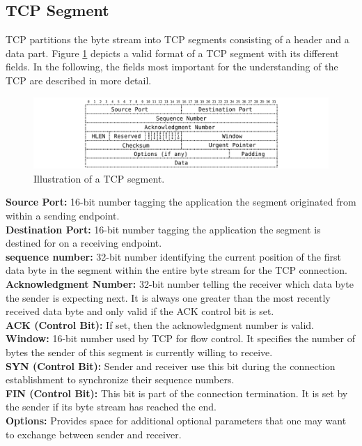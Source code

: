 \subsection*{TCP Segment}

TCP partitions the byte stream into TCP segments consisting of a header and a data part. Figure \ref{fig:TCPSegment} depicts a valid format of a TCP segment with its different fields. In the following, the fields most important for the understanding of the TCP are described in more detail. 

\begin{figure} [H]
	\begin{center}
		\def\svgwidth{1\textwidth}
		\includegraphics[scale=0.2]{../illustrations/importantConcepts/TCPSegment.pdf}  
		\caption[Caption for the list of figures.]{Illustration of a TCP segment.}
		\label{fig:TCPSegment}
	\end{center}
\end{figure}

{\small \textbf{Source Port:} 16-bit number tagging the application the segment originated from within a sending endpoint. \smallskip\\
\textbf{Destination Port:} 16-bit number tagging the application the segment is destined for on a receiving endpoint. \smallskip\\
\textbf{sequence number:} 32-bit number identifying the current position of the first data byte in the segment within the entire byte stream for the TCP connection. \smallskip\\
\textbf{Acknowledgment Number:} 32-bit number telling the receiver which data byte the sender is expecting next. It is always one greater than the most recently received data byte and only valid if the ACK control bit is set. \smallskip\\
\textbf{ACK (Control Bit):} If set, then the acknowledgment number is valid. \smallskip\\
\textbf{Window:} 16-bit number used by TCP for flow control. It specifies the number of bytes the sender of this segment is currently willing to receive. \smallskip\\
\textbf{SYN (Control Bit):} Sender and receiver use this bit during the connection establishment to synchronize their sequence numbers.  \smallskip\\
\textbf{FIN (Control Bit):} This bit is part of the connection termination. It is set by the sender if its byte stream has reached the end. \smallskip\\
\textbf{Options:} Provides space for additional optional parameters that one may want to exchange between sender and receiver. 
}
 
